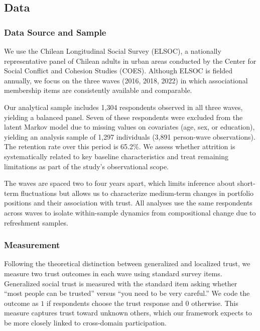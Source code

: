 \subsection{Data}

\subsubsection{Data Source and Sample}

We use the Chilean Longitudinal Social Survey (ELSOC), a nationally representative panel of Chilean adults in urban areas conducted by the Center for Social Conflict and Cohesion Studies (COES). Although ELSOC is fielded annually, we focus on the three waves (2016, 2018, 2022) in which associational membership items are consistently available and comparable.

Our analytical sample includes 1{,}304 respondents observed in all three waves, yielding a balanced panel. Seven of these respondents were excluded from the latent Markov model due to missing values on covariates (age, sex, or education), yielding an analysis sample of 1{,}297 individuals (3{,}891 person-wave observations). The retention rate over this period is 65.2\%. We assess whether attrition is systematically related to key baseline characteristics and treat remaining limitations as part of the study's observational scope.

The waves are spaced two to four years apart, which limits inference about short-term fluctuations but allows us to characterize medium-term changes in portfolio positions and their association with trust. All analyses use the same respondents across waves to isolate within-sample dynamics from compositional change due to refreshment samples.

\subsubsection{Measurement}


Following the theoretical distinction between generalized and localized trust, we measure two trust outcomes in each wave using standard survey items. Generalized social trust is measured with the standard item asking whether ``most people can be trusted'' versus ``you need to be very careful.'' We code the outcome as $1$ if respondents choose the trust response and $0$ otherwise. This measure captures trust toward unknown others, which our framework expects to be more closely linked to cross-domain participation.

